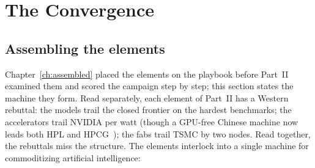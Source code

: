 \chapter{The Convergence}
\label{ch:synthesis}

\section{Assembling the elements}

Chapter~\ref{ch:assembled} placed the elements on the playbook before Part~II examined them and scored the campaign step by step; this section states the machine they form. Read separately, each element of Part~II has a Western rebuttal: the models trail the closed frontier on the hardest benchmarks; the accelerators trail NVIDIA per watt (though a GPU-free Chinese machine now leads both HPL and HPCG~\cite{top500-lineshine}); the fabs trail TSMC by two nodes. Read together, the rebuttals miss the structure. The elements interlock into a single machine for commoditizing artificial intelligence:

